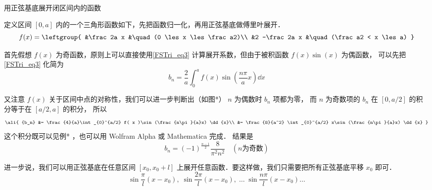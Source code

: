 \begin{exam}{用正弦基底展开闭区间内的函数}

定义区间 $[0,a]$ 内的一个三角形函数如下，先把函数归一化，再用正弦基底做傅里叶展开．
\begin{equation}
f(x) = \leftgroup{
&\frac2a x &\quad (0 \les x \les \frac a2)\\
&2 -\frac2a x &\quad (\frac a2 < x \les a)
}\end{equation}

首先假想 $f(x)$ 为奇函数，原则上可以直接使用\autoref{FSTri_eq3} 计算展开系数，但由于被积函数 $f(x)\sin(x)$ 为偶函数， 可以先把\autoref{FSTri_eq3} 化简为%
\begin{equation}
{b_n} = \frac{2}{a}\int_{0}^a f( x )\sin (\frac{n\pi}{a}x) \dd{x}
\end{equation}


又注意 $f(x)$ 关于区间中点的对称性，我们可以进一步判断出（如图*） $n$ 为偶数时 $b_n$ 项都为零， 而 $n$ 为奇数项的 $b_n$ 在 $[0,a/2]$ 的积分等于在 $[a/2,a]$ 的积分， 所以
\begin{equation}
\ali{
{b_n} &= \frac{4}{a}\int_{0}^{a/2} f( x )\sin (\frac{n\pi}{a}x) \dd{x}\\
&= \frac{8}{a^2} \int_{0}^{a/2} x\sin (\frac{n\pi}{a}x) \dd{x}
}\end{equation}
这个积分既可以见例*%
，也可以用 Wolfram Alpha 或 Mathematica 完成．%
结果是
\begin{equation}
b_n = (-1)^{\frac{n-1}{2}} \frac{8}{\pi^2 n^2} \quad (n\text{为奇数})
\end{equation}

\end{exam}

进一步说，我们可以用正弦基底在任意区间 $[x_0,x_0+l]$ 上展开任意函数．要这样做，我们只需要把所有正弦基底平移 $x_0$ 即可．
\begin{equation}
\sin\frac{\pi}{l} (x-x_0),\;   \sin\frac{2\pi}{l} (x-x_0),\;    \dots\;\sin\frac{n\pi}{l} (x-x_0) \dots
\end{equation}


